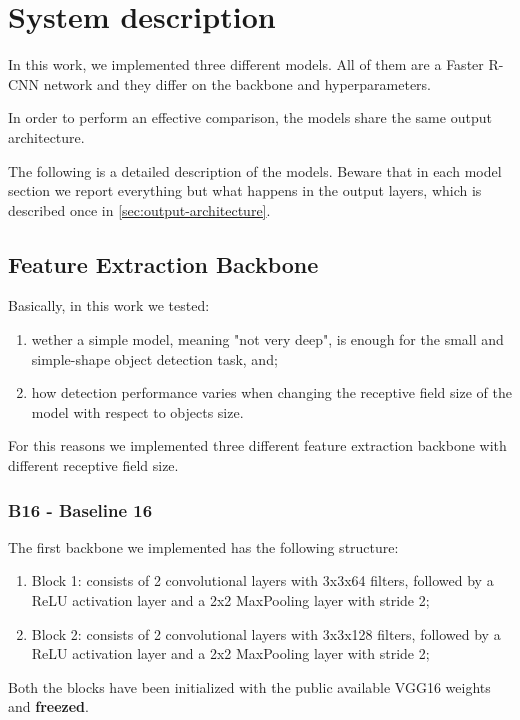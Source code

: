 \documentclass[a4paper,10pt]{report}
\begin{document}
\chapter{System description}\label{chap:system-description}

In this work, we implemented three different models. All of them are a Faster R-CNN network and they differ on the backbone and hyperparameters.

In order to perform an effective comparison, the models share the same output architecture.

The following is a detailed description of the models. Beware that in each model section we report everything but what happens in the output layers, which is described once in \ref{sec:output-architecture}.

\section{Feature Extraction Backbone}\label{sec:feature-extraction-backbone}
Basically, in this work we tested:
\begin{enumerate}
\item wether a simple model, meaning "not very deep", is enough for the small and simple-shape object detection task, and;
\item how detection performance varies when changing the receptive field size of the model with respect to objects size.
\end{enumerate}

For this reasons we implemented three different feature extraction backbone with different receptive field size.

\subsection{B16 - Baseline 16}\label{subsec:b16}

The first backbone we implemented has the following structure:
\begin{enumerate}
  \item Block 1: consists of 2 convolutional layers with 3x3x64 filters, followed by a ReLU activation layer and a 2x2 MaxPooling layer with stride 2;
  \item Block 2: consists of 2 convolutional layers with 3x3x128 filters, followed by a ReLU activation layer and a 2x2 MaxPooling layer with stride 2;
\end{enumerate}
Both the blocks have been initialized with the public available VGG16 weights and \textbf{freezed}.
\end{document}
